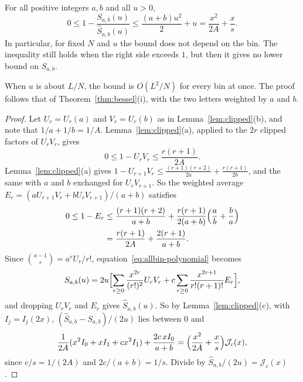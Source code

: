 \begin{theorem}\label{thm:allbin-bessel}
For all positive integers $a,b$ and all $u>0$,
\begin{equation}\label{eq:allbin-bessel}
 0\le 1-\frac{S_{a,b}(u)}{\widehat S_{a,b}(u)}
 \le \frac{(a+b)u^2}{2}+u
 =\frac{x^2}{2A}+\frac xs.
\end{equation}
In particular, for fixed $N$ and $u$ the bound does not depend on the bin.
The inequality still holds when the right side exceeds $1$, but then it gives no
lower bound on $S_{a,b}$.
\end{theorem}

When $u$ is about $L/N$, the bound is $O(L^2/N)$ for every bin at once. The
proof follows that of Theorem~\ref{thm:bessel}(i), with the two letters
weighted by $a$ and $b$.

\begin{proof}
Let $U_r=U_r(a)$ and $V_r=U_r(b)$ as in Lemma~\ref{lem:clipped}(b), and note
that $1/a+1/b=1/A$. Lemma~\ref{lem:clipped}(a), applied to the $2r$ clipped
factors of $U_rV_r$, gives
\begin{equation}\label{eq:allbin-odd-deficit}
 0\le1-U_rV_r\le\frac{r(r+1)}{2A}.
\end{equation}
Lemma~\ref{lem:clipped}(a) gives $1-U_{r+1}V_r\le\frac{(r+1)(r+2)}{2a}+\frac{r(r+1)}{2b}$,
and the same with $a$ and $b$ exchanged for $U_rV_{r+1}$. So the weighted
average $E_r=(aU_{r+1}V_r+bU_rV_{r+1})/(a+b)$ satisfies
\begin{align}
 0\le1-E_r
 &\le\frac{(r+1)(r+2)}{a+b}
 +\frac{r(r+1)}{2(a+b)}\Bigl(\frac ab+\frac ba\Bigr)\notag\\
 &=\frac{r(r+1)}{2A}+\frac{2(r+1)}{a+b}.\label{eq:allbin-even-deficit}
\end{align}
Since $\binom{a-1}r=a^rU_r/r!$, equation~\eqref{eq:allbin-polynomial} becomes
\begin{equation}\label{eq:allbin-normalized-series}
 S_{a,b}(u)=2u\Bigl[
 \sum_{r\ge0}\frac{x^{2r}}{(r!)^2}U_rV_r
 +c\sum_{r\ge0}\frac{x^{2r+1}}{r!(r+1)!}E_r\Bigr],
\end{equation}
and dropping $U_rV_r$ and $E_r$ gives $\widehat S_{a,b}(u)$. So by
Lemma~\ref{lem:clipped}(c), with $I_j=I_j(2x)$,
$(\widehat S_{a,b}-S_{a,b})/(2u)$ lies between $0$ and
\[
 \frac1{2A}(x^2I_0+xI_1+cx^2I_1)+\frac{2c\,xI_0}{a+b}
 =\Bigl(\frac{x^2}{2A}+\frac xs\Bigr)\mathcal J_c(x),
\]
since $c/s=1/(2A)$ and $2c/(a+b)=1/s$. Divide by $\widehat S_{a,b}/(2u)=\mathcal J_c(x)$.
\end{proof}

